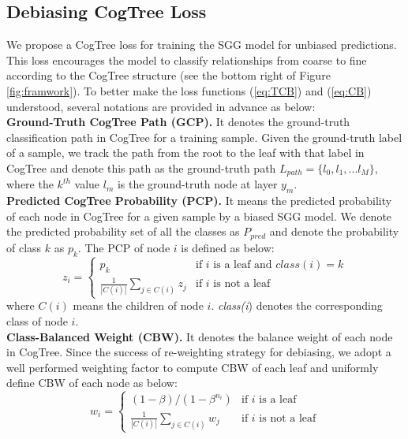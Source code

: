 \documentclass{article}
\begin{document}
\subsection{Debiasing CogTree Loss}
\label{sec:TreeLoss}
We propose a CogTree loss for training the SGG model for unbiased predictions. This loss encourages the model to classify relationships from coarse to fine according to the CogTree structure (see the bottom right of Figure \ref{fig:framwork}). To better make the loss functions (\ref{eq:TCB}) and (\ref{eq:CB}) understood, several notations are provided in advance as below:
\\
\textbf{Ground-Truth CogTree Path (GCP).} It denotes the ground-truth classification path in CogTree for a training sample. Given the ground-truth label of a sample, we track the path from the root to the leaf with that label in CogTree and denote this path as the ground-truth path $L_{path}=\{l_{0}, l_{1}, ... l_{M}\}$, where the $k^{th}$ value $l_{m}$ is the ground-truth node at layer $y_m$.
\\
\textbf{Predicted CogTree Probability (PCP).} It means the predicted probability of each node in CogTree for a given sample by a biased SGG model. We denote the predicted probability set of all the classes  as $P_{pred}$ and denote the probability of class $k$ as $p_k$. The PCP of node $i$ is defined as below:
\begin{equation}
z_i=\begin{cases}
p_k & \text{if } i \text{ is a leaf and } class(\textit{i})=k \\ 
\frac{1}{\left | C(i) \right |} \sum_{j\in C(i)} z_j & \text{if } i \text{ is not a leaf}
\end{cases}
\label{eq:probability}
\end{equation}
where $C(i)$ means the children of node $i$. \textit{class(i}) denotes the corresponding class of node
$i$.
\\
\textbf{Class-Balanced Weight (CBW).}  It denotes the balance weight of each node in CogTree. Since the success of re-weighting strategy for debiasing, we adopt a well performed weighting factor \cite{Cui2019Class} to compute CBW of each leaf and uniformly define CBW of each node as below:
\begin{equation}
w_i=\begin{cases}
(1-\beta)/(1-\beta^{n_i}) & \text{if } i \text{ is a leaf} \\ 
\frac{1}{\left | C(i) \right |} \sum_{j\in C(i)} w_j& \text{if } i \text{ is not a leaf}
\end{cases}
\label{eq:weight}
\end{equation}
\end{document}
